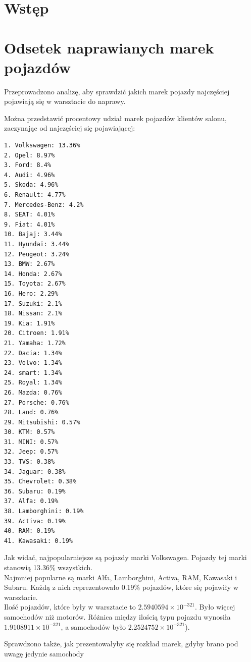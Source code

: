 \documentclass{article}\usepackage[]{graphicx}\usepackage[]{xcolor}
\begin{document}
\section{Wstęp}

\section{Odsetek naprawianych marek pojazdów}

Przeprowadzono analizę, aby sprawdzić jakich marek pojazdy najczęściej pojawiają się w warsztacie do naprawy. 



Można przedstawić procentowy udział marek pojazdów klientów salonu, zaczynając od najczęściej się pojawiającej:

\begin{verbatim}
1. Volkswagen: 13.36%
2. Opel: 8.97%
3. Ford: 8.4%
4. Audi: 4.96%
5. Skoda: 4.96%
6. Renault: 4.77%
7. Mercedes-Benz: 4.2%
8. SEAT: 4.01%
9. Fiat: 4.01%
10. Bajaj: 3.44%
11. Hyundai: 3.44%
12. Peugeot: 3.24%
13. BMW: 2.67%
14. Honda: 2.67%
15. Toyota: 2.67%
16. Hero: 2.29%
17. Suzuki: 2.1%
18. Nissan: 2.1%
19. Kia: 1.91%
20. Citroen: 1.91%
21. Yamaha: 1.72%
22. Dacia: 1.34%
23. Volvo: 1.34%
24. smart: 1.34%
25. Royal: 1.34%
26. Mazda: 0.76%
27. Porsche: 0.76%
28. Land: 0.76%
29. Mitsubishi: 0.57%
30. KTM: 0.57%
31. MINI: 0.57%
32. Jeep: 0.57%
33. TVS: 0.38%
34. Jaguar: 0.38%
35. Chevrolet: 0.38%
36. Subaru: 0.19%
37. Alfa: 0.19%
38. Lamborghini: 0.19%
39. Activa: 0.19%
40. RAM: 0.19%
41. Kawasaki: 0.19%
\end{verbatim}

Jak widać, najpopularniejsze są pojazdy marki Volkswagen. Pojazdy tej marki stanowią 13.36\% wszystkich. \\

Najmniej popularne są marki Alfa, Lamborghini, Activa, RAM, Kawasaki i Subaru. Każdą z nich reprezentowało 0.19\% pojazdów, które się pojawiły w warsztacie. \\

Ilość pojazdów, które były w warsztacie to \ensuremath{2.5940594\times 10^{-321}}. Było więcej samochodów niż motorów. Różnica między ilością typu pojazdu wynosiła \ensuremath{1.9108911\times 10^{-321}}, a samochodów było \ensuremath{2.2524752\times 10^{-321}}).

Sprawdzono także, jak prezentowałyby się rozkład marek, gdyby brano pod uwagę jedynie samochody
\end{document}
